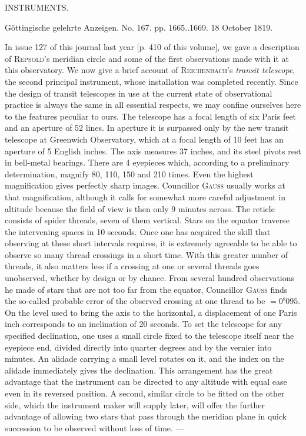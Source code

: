 \clearpage
{}
\hypertarget{native-427-part-lower}{}
\begin{center}
\Large INSTRUMENTS.
\end{center}



\begin{center}
Göttingische gelehrte Anzeigen. No. 167. pp. 1665..1669. 18 October 1819.
\end{center}





In issue 127 of this journal last year [p. 410 of this volume], we gave a description of \textsc{Repsold}’s meridian circle and some of the first observations made with it at this observatory. We now give a brief account of \textsc{Reichenbach}’s \emph{transit telescope}, the second principal instrument, whose installation was completed recently. Since the design of transit telescopes in use at the current state of observational practice is always the same in all essential respects, we may confine ourselves here to the features peculiar to ours. The telescope has a focal length of six Paris feet and an aperture of 52 lines. In aperture it is surpassed only by the new transit telescope at Greenwich Observatory, which at a focal length of 10 feet has an aperture of 5 English inches. The axis measures 37 inches, and its steel pivots rest in bell-metal bearings. There are 4 eyepieces which, according to a preliminary determination, magnify 80, 110, 150 and 210 times. Even the highest magnification gives perfectly sharp images. Councillor \textsc{Gauss} usually works at that magnification, although it calls for somewhat more careful adjustment in altitude because the field of view is then only 9 minutes across. The reticle consists of spider threads, seven of them vertical. Stars on the equator traverse the intervening spaces in 10 seconds. Once one has acquired the skill that observing at these short intervals requires, it is extremely agreeable to be able to observe so many thread crossings in a short time. With this greater number of threads, it also matters less if a crossing at one or several threads goes unobserved, whether by design or by chance. From several hundred observations he made of stars that are not too far from the equator, Councillor \textsc{Gauss} finds the so-called probable error of the observed crossing at one thread to be $=0^{\mathrm s}095$. On the level used to bring the axis to the horizontal, a displacement of one Paris inch corresponds to an inclination of 20 seconds. To set the telescope for any specified declination, one uses a small circle fixed to the telescope itself near the eyepiece end, divided directly into quarter degrees and by the vernier into minutes. An alidade carrying a small level rotates on it, and the index on the alidade immediately gives the declination. This arrangement has the great advantage that the instrument can be directed to any altitude with equal ease even in its reversed position. A second, similar circle to be fitted on the other side, which the instrument maker will supply later, will offer the further advantage of allowing two stars that pass through the meridian plane in quick succession to be observed without loss of time. ---
